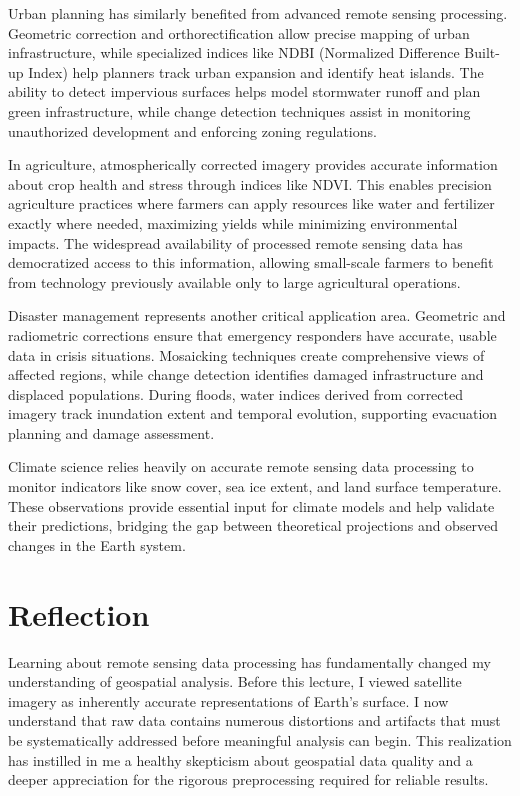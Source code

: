 \documentclass[
  letterpaper,
]{scrbook}
\begin{document}
Urban planning has similarly benefited from advanced remote sensing
processing. Geometric correction and orthorectification allow precise
mapping of urban infrastructure, while specialized indices like NDBI
(Normalized Difference Built-up Index) help planners track urban
expansion and identify heat islands. The ability to detect impervious
surfaces helps model stormwater runoff and plan green infrastructure,
while change detection techniques assist in monitoring unauthorized
development and enforcing zoning regulations.

In agriculture, atmospherically corrected imagery provides accurate
information about crop health and stress through indices like NDVI. This
enables precision agriculture practices where farmers can apply
resources like water and fertilizer exactly where needed, maximizing
yields while minimizing environmental impacts. The widespread
availability of processed remote sensing data has democratized access to
this information, allowing small-scale farmers to benefit from
technology previously available only to large agricultural operations.

Disaster management represents another critical application area.
Geometric and radiometric corrections ensure that emergency responders
have accurate, usable data in crisis situations. Mosaicking techniques
create comprehensive views of affected regions, while change detection
identifies damaged infrastructure and displaced populations. During
floods, water indices derived from corrected imagery track inundation
extent and temporal evolution, supporting evacuation planning and damage
assessment.

Climate science relies heavily on accurate remote sensing data
processing to monitor indicators like snow cover, sea ice extent, and
land surface temperature. These observations provide essential input for
climate models and help validate their predictions, bridging the gap
between theoretical projections and observed changes in the Earth
system.


\chapter{Reflection}\label{reflection-1}

Learning about remote sensing data processing has fundamentally changed
my understanding of geospatial analysis. Before this lecture, I viewed
satellite imagery as inherently accurate representations of Earth's
surface. I now understand that raw data contains numerous distortions
and artifacts that must be systematically addressed before meaningful
analysis can begin. This realization has instilled in me a healthy
skepticism about geospatial data quality and a deeper appreciation for
the rigorous preprocessing required for reliable results.
\end{document}

